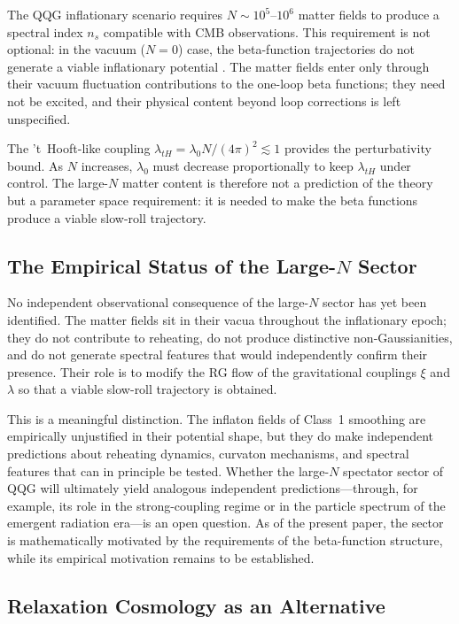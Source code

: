 \documentclass[12pt, a4paper]{article}
\begin{document}
The QQG inflationary scenario requires $N \sim 10^5$--$10^6$ matter fields to
produce a spectral index $n_s$ compatible with CMB observations. This requirement
is not optional: in the vacuum ($N = 0$) case, the beta-function trajectories do
not generate a viable inflationary potential \citep{Liu2026}. The matter fields
enter only through their vacuum fluctuation contributions to the one-loop beta
functions; they need not be excited, and their physical content beyond loop
corrections is left unspecified.

The 't~Hooft-like coupling $\lambda_{tH} = \lambda_0 N/(4\pi)^2 \lesssim 1$ provides
the perturbativity bound. As $N$ increases, $\lambda_0$ must decrease
proportionally to keep $\lambda_{tH}$ under control. The large-$N$ matter content
is therefore not a prediction of the theory but a parameter space requirement: it
is needed to make the beta functions produce a viable slow-roll trajectory.

\subsection{The Empirical Status of the Large-$N$ Sector}

No independent observational consequence of the large-$N$ sector has yet been
identified. The matter fields sit in their vacua throughout the inflationary epoch;
they do not contribute to reheating, do not produce distinctive non-Gaussianities,
and do not generate spectral features that would independently confirm their
presence. Their role is to modify the RG flow of the gravitational couplings $\xi$
and $\lambda$ so that a viable slow-roll trajectory is obtained.

This is a meaningful distinction. The inflaton fields of Class~1 smoothing are
empirically unjustified in their potential shape, but they do make independent
predictions about reheating dynamics, curvaton mechanisms, and spectral features
that can in principle be tested. Whether the large-$N$ spectator sector of QQG
will ultimately yield analogous independent predictions---through, for example,
its role in the strong-coupling regime or in the particle spectrum of the emergent
radiation era---is an open question. As of the present paper, the sector is
mathematically motivated by the requirements of the beta-function structure, while
its empirical motivation remains to be established.

\subsection{Relaxation Cosmology as an Alternative}
\end{document}
